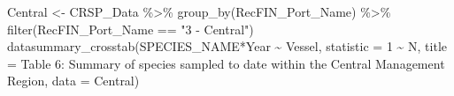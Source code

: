 \documentclass[
  letterpaper,
  DIV=11,
  numbers=noendperiod]{scrartcl}
\newenvironment{Shaded}{\begin{snugshade}}{\end{snugshade}}
\newcommand{\AttributeTok}[1]{\textcolor[rgb]{0.40,0.45,0.13}{#1}}
\newcommand{\DecValTok}[1]{\textcolor[rgb]{0.68,0.00,0.00}{#1}}
\newcommand{\FunctionTok}[1]{\textcolor[rgb]{0.28,0.35,0.67}{#1}}
\newcommand{\NormalTok}[1]{\textcolor[rgb]{0.00,0.23,0.31}{#1}}
\newcommand{\OtherTok}[1]{\textcolor[rgb]{0.00,0.23,0.31}{#1}}
\newcommand{\SpecialCharTok}[1]{\textcolor[rgb]{0.37,0.37,0.37}{#1}}
\newcommand{\StringTok}[1]{\textcolor[rgb]{0.13,0.47,0.30}{#1}}
\begin{document}
\begin{Shaded}
\begin{Highlighting}[]
\NormalTok{Central }\OtherTok{\textless{}{-}}\NormalTok{ CRSP\_Data }\SpecialCharTok{\%\textgreater{}\%}
  \FunctionTok{group\_by}\NormalTok{(RecFIN\_Port\_Name) }\SpecialCharTok{\%\textgreater{}\%}
  \FunctionTok{filter}\NormalTok{(RecFIN\_Port\_Name }\SpecialCharTok{==} \StringTok{"3 {-} Central"}\NormalTok{)}
\FunctionTok{datasummary\_crosstab}\NormalTok{(SPECIES\_NAME}\SpecialCharTok{*}\NormalTok{Year }\SpecialCharTok{\textasciitilde{}}\NormalTok{ Vessel, }\AttributeTok{statistic =} \DecValTok{1} \SpecialCharTok{\textasciitilde{}}\NormalTok{ N, }\AttributeTok{title =} \StringTok{\textquotesingle{}Table 6: Summary of species sampled to date within the Central Management Region\textquotesingle{}}\NormalTok{, }\AttributeTok{data =}\NormalTok{ Central)}
\end{Highlighting}
\end{Shaded}
\end{document}
